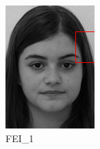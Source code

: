 \documentclass{article}
\begin{document}
\begin{figure}[h!]
	\centering
	\begin{subfigure}{0.49\linewidth}
		\includegraphics[width=\linewidth]{flgp_selection_f1.jpg}
		\caption{FEI\_1}
	\end{subfigure}
	\begin{subfigure}{0.49\linewidth}

\end{subfigure}
\end{figure}
\end{document}
